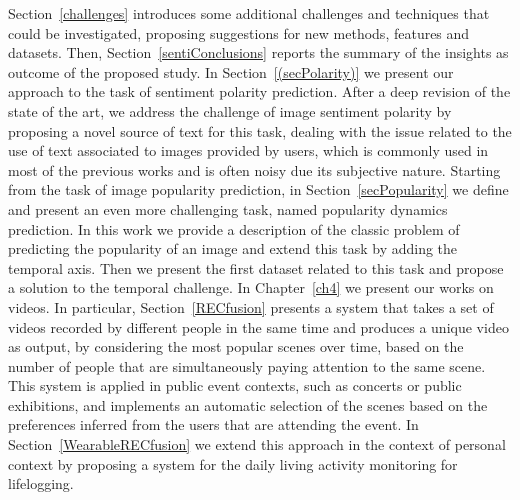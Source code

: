 Section~\ref{challenges} introduces some additional challenges and techniques that could be investigated, proposing suggestions for new methods, features and datasets.
Then, Section~\ref{sentiConclusions} reports the summary of the insights as outcome of the proposed study.
In Section~\ref{(secPolarity)} we present our approach to the task of sentiment polarity prediction. After a deep revision of the state of the art, we address the challenge of image sentiment polarity by proposing a novel source of text for this task, dealing with the issue related to the use of text associated to images provided by users, which is commonly used in most of the previous works and is often noisy due its subjective nature.
Starting from the task of image popularity prediction, in Section~\ref{secPopularity} we define and present an even more challenging task, named popularity dynamics prediction. In this work we provide a description of the classic problem of predicting the popularity of an image and extend this task by adding the temporal axis. 
Then we present the first dataset related to this task and propose a solution to the temporal challenge.
In Chapter~\ref{ch4} we present our works on videos. In particular, Section~\ref{RECfusion} presents a system that takes a set of videos recorded by different people in the same time and produces a unique video as output, by considering the most popular scenes over time, based on the number of people that are simultaneously paying attention to the same scene. This system is applied in public event contexts, such as concerts or public exhibitions, and implements an automatic selection of the scenes based on the preferences inferred from the users that are attending the event.
In Section~\ref{WearableRECfusion} we extend this approach in the context of personal context by proposing a system for the daily living activity monitoring for lifelogging.


